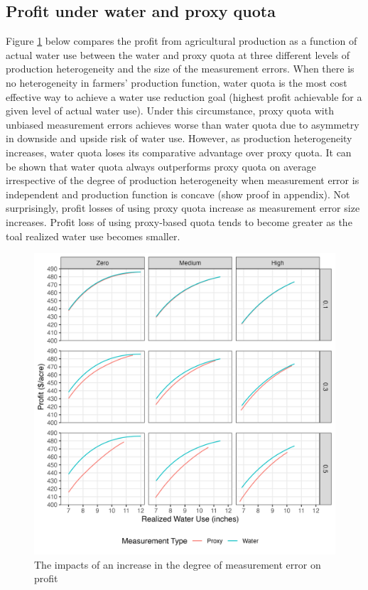 \documentclass[
]{article}
\begin{document}
\subsection{Profit under water and proxy quota}\label{profit-under-water-and-proxy-quota}

Figure \ref{fig:profit-quota-water-het} below compares the profit from agricultural production as a function of actual water use between the water and proxy quota at three different levels of production heterogeneity and the size of the measurement errors. When there is no heterogeneity in farmers' production function, water quota is the most cost effective way to achieve a water use reduction goal (highest profit achievable for a given level of actual water use). Under this circumstance, proxy quota with unbiased measurement errors achieves worse than water quota due to asymmetry in downside and upside risk of water use. However, as production heterogeneity increases, water quota loses its comparative advantage over proxy quota. It can be shown that water quota always outperforms proxy quota on average irrespective of the degree of production heterogeneity when measurement error is independent and production function is concave (show proof in appendix). Not surprisingly, profit losses of using proxy quota increase as measurement error size increases. Profit loss of using proxy-based quota tends to become greater as the toal realized water use becomes smaller.

\begin{figure}[H]

{\centering \includegraphics{figures/g_profit_quota_comp_stat} 

}

\caption{The impacts of an increase in the degree of measurement error on profit}\label{fig:profit-quota-water-het}
\end{figure}
\end{document}
